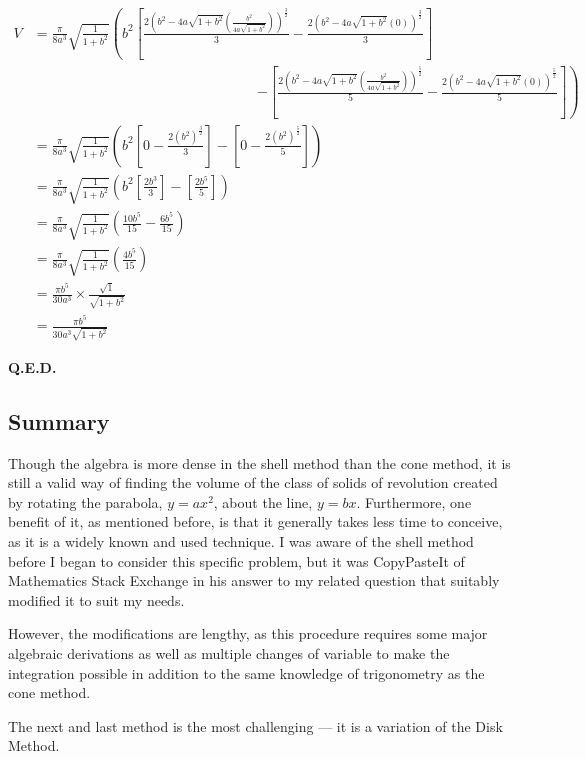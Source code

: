 \documentclass{article}
\begin{document}
\begin{align*}
V &= \frac{\pi}{8a^3}\sqrt{\frac{1}{1+b^2}}\left(b^2\left[\frac{2\left(b^2-4a\sqrt{1+b^2}\left(\frac{b^2}{4a\sqrt{1+b^2}}\right)\right)^{\frac{3}{2}}}{3}-\frac{2\left(b^2-4a\sqrt{1+b^2}\left(0\right)\right)^{\frac{3}{2}}}{3}\right]\right.\\
   &\hspace{16em} \left.-\left[\frac{2\left(b^2-4a\sqrt{1+b^2}\left(\frac{b^2}{4a\sqrt{1+b^2}}\right)\right)^{\frac{5}{2}}}{5}-\frac{2\left(b^2-4a\sqrt{1+b^2}\left(0\right)\right)^{\frac{5}{2}}}{5}\right]\right)\\
   &= \frac{\pi}{8a^3}\sqrt{\frac{1}{1+b^2}}\left(b^2\left[0-\frac{2\left(b^2\right)^{\frac{3}{2}}}{3}\right]-\left[0-\frac{2\left(b^2\right)^{\frac{5}{2}}}{5}\right]\right)\\
   &= \frac{\pi}{8a^3}\sqrt{\frac{1}{1+b^2}}\left(b^2\left[\frac{2b^3}{3}\right]-\left[\frac{2b^5}{5}\right]\right)\\
   &= \frac{\pi}{8a^3}\sqrt{\frac{1}{1+b^2}}\left(\frac{10b^5}{15}-\frac{6b^5}{15}\right)\\
   &= \frac{\pi}{8a^3}\sqrt{\frac{1}{1+b^2}}\left(\frac{4b^5}{15}\right)\\
   &= \frac{\pi b^5}{30a^3}\times\frac{\sqrt{1}}{\sqrt{1+b^2}}\\
   &= \frac{\pi b^5}{30a^3\sqrt{1+b^2}}\tag{9}
\end{align*}\par
\begin{flushright}
\textbf{Q.E.D.}
\end{flushright}

\subsection{Summary}
Though the algebra is more dense in the shell method than the cone method, it is still a valid way of finding the volume of the class of solids of revolution created by rotating the parabola, $y=ax^2$, about the line, $y=bx$. Furthermore, one benefit of it, as mentioned before, is that it generally takes less time to conceive, as it is a widely known and used technique. I was aware of the shell method before I began to consider this specific problem, but it was CopyPasteIt of Mathematics Stack Exchange in his answer \cite{BIB:shell} to my related question \cite{BIB:disk2} that suitably modified it to suit my needs.\par
However, the modifications are lengthy, as this procedure requires some major algebraic derivations as well as multiple changes of variable to make the integration possible in addition to the same knowledge of trigonometry as the cone method.\par
The next and last method is the most challenging --- it is a variation of the Disk Method.
\newpage
\end{document}
